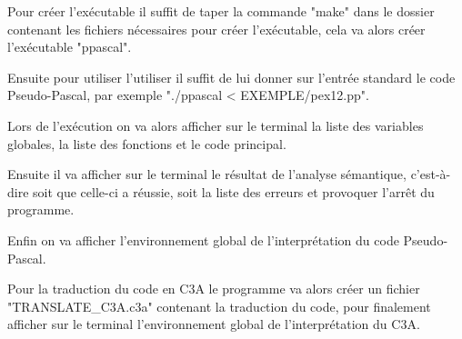 \documentclass{report}
\begin{document}
Pour créer l'exécutable il suffit de taper la commande "make" dans le dossier contenant les fichiers nécessaires pour créer l'exécutable, cela va alors créer l'exécutable "ppascal".

Ensuite pour utiliser l'utiliser il suffit de lui donner sur l'entrée standard le code Pseudo-Pascal, par exemple "./ppascal < EXEMPLE/pex12.pp".

Lors de l'exécution on va alors afficher sur le terminal la liste des variables globales, la liste des fonctions et le code principal.

Ensuite il va afficher sur le terminal le résultat de l'analyse sémantique, c'est-à-dire soit que celle-ci a réussie, soit la liste des erreurs et provoquer l'arrêt du programme.

Enfin on va afficher l'environnement global de l'interprétation du code Pseudo-Pascal.

Pour la traduction du code en C3A le programme va alors créer un fichier "TRANSLATE\_C3A.c3a" contenant la traduction du code, pour finalement afficher sur le terminal l'environnement global de l'interprétation du C3A.
\end{document}
